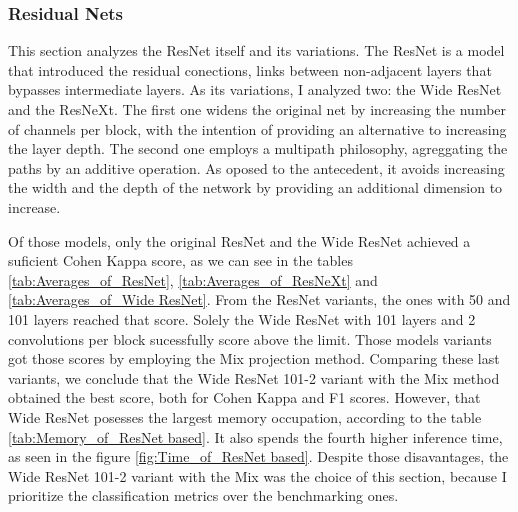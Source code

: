 




\FloatBarrier

\subsubsection{Residual Nets}

This section analyzes the ResNet itself and its variations. The ResNet is a model that introduced the residual conections, links between non-adjacent layers that bypasses intermediate layers. As its variations, I analyzed two: the Wide ResNet and the ResNeXt. The first one widens the original net by increasing the number of channels per block, with the intention of providing an alternative to increasing the layer depth. The second one employs a multipath philosophy, agreggating the paths by an additive operation. As oposed to the antecedent, it avoids increasing the width and the depth of the network by providing an additional dimension to increase. 

Of those models, only the original ResNet and the Wide ResNet achieved a suficient Cohen Kappa score, as we can see in the tables \ref{tab:Averages_of_ResNet}, \ref{tab:Averages_of_ResNeXt} and \ref{tab:Averages_of_Wide ResNet}. From the ResNet variants, the ones with 50 and 101 layers reached that score. Solely the Wide ResNet with 101 layers and 2 convolutions per block sucessfully score above the limit. Those models variants got those scores by employing the \gls{Mix} projection method. Comparing these last variants, we conclude that the Wide ResNet 101-2 variant with the \gls{Mix} method obtained the best score, both for Cohen Kappa and F1 scores. However, that Wide ResNet posesses the largest memory occupation, according to the table \ref{tab:Memory_of_ResNet based}. It also spends the fourth higher inference time, as seen in the figure \ref{fig:Time_of_ResNet based}. Despite those disavantages, the Wide ResNet 101-2 variant with the \gls{Mix} was the choice of this section, because I prioritize the classification metrics over the benchmarking ones.







